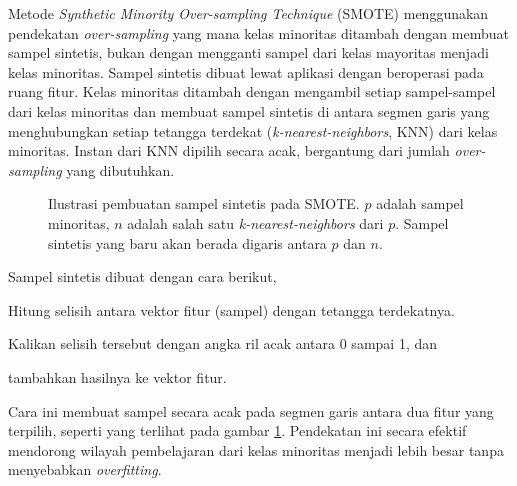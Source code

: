 Metode \textit{Synthetic Minority Over-sampling Technique} (SMOTE)
\cite{chawla2002smote} menggunakan pendekatan \textit{over-sampling} yang mana
kelas minoritas ditambah dengan membuat sampel sintetis, bukan dengan
mengganti sampel dari kelas mayoritas menjadi kelas minoritas.
Sampel sintetis dibuat lewat aplikasi dengan beroperasi pada
ruang fitur.
Kelas minoritas ditambah dengan mengambil setiap sampel-sampel dari kelas
minoritas dan membuat sampel sintetis di antara segmen garis yang menghubungkan
setiap tetangga terdekat (\textit{k-nearest-neighbors}, KNN) dari kelas
minoritas.
Instan dari KNN dipilih secara acak, bergantung dari jumlah
\textit{over-sampling} yang dibutuhkan.

\begin{figure}[htbp]
\centering
\setlength\fboxsep{4pt}
	\caption{
	Ilustrasi pembuatan sampel sintetis pada SMOTE.
	$p$ adalah sampel minoritas, $n$ adalah salah satu
	\textit{k-nearest-neighbors} dari $p$.
	Sampel sintetis yang baru akan berada digaris antara $p$ dan $n$.
	}
	\label{fig:smote}
\end{figure}

Sampel sintetis dibuat dengan cara berikut,
\begin{compactitem}%
	\item Hitung selisih antara vektor fitur (sampel) dengan tetangga
	terdekatnya.
	\item Kalikan selisih tersebut dengan angka ril acak antara 0 sampai 1,
	dan
	\item tambahkan hasilnya ke vektor fitur.
\end{compactitem}

\newpage
Cara ini membuat sampel secara acak pada segmen garis antara dua fitur yang
terpilih, seperti yang terlihat pada gambar \ref{fig:smote}.
Pendekatan ini secara efektif mendorong wilayah pembelajaran dari kelas
minoritas menjadi lebih besar tanpa menyebabkan \textit{overfitting}.
